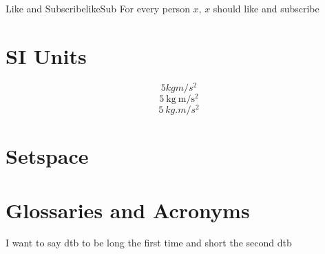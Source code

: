 \begin{theo}{Like and Subscribe}{likeSub}
    For every person $x$, $x$ should like and subscribe
\end{theo}
\section{SI Units}
\[5kgm/s^2\]
\[5\ \mathrm{kg}\ \mathrm{m} / \mathrm{s} ^2\]
\[5\ \si{kg.m/s^2}\]
\section{Setspace}
\lipsum[1-5]\cite{overleaf-space}
\section{Glossaries and Acronyms}
I want to say \gls{dtb} to be long the first time and short the second \gls{dtb}